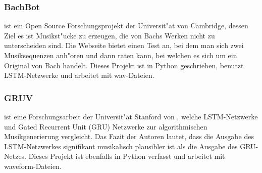 {\subsubsection{BachBot}
\cite{bachbot} ist ein Open Source Forschungsprojekt der Universit"at von Cambridge, dessen Ziel es ist Musikst"ucke zu erzeugen, die von Bachs Werken nicht zu unterscheiden sind. Die Webseite bietet einen Test an, bei dem man sich zwei Musiksequenzen anh"oren und dann raten kann, bei welchen es sich um ein Original von Bach handelt. Dieses Projekt ist in Python geschrieben, benutzt LSTM-Netzwerke und arbeitet mit wav-Dateien.

\subsubsection{GRUV}
\cite{GRUV} ist eine Forschungsarbeit der Universit"at Stanford von \cite{GruvPaper}, welche LSTM-Netzwerke und Gated Recurrent Unit (GRU) Netzwerke zur algorithmischen Musikgenerierung vergleicht. Das Fazit der Autoren lautet, dass die Ausgabe des LSTM-Netzwerkes signifikant musikalisch plausibler ist als die Ausgabe des GRU-Netzes. Dieses Projekt ist ebenfalls in Python verfasst und arbeitet mit waveform-Dateien.

} %